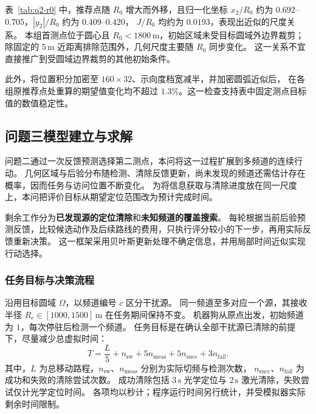 \documentclass[UTF8,a4paper,12pt]{ctexart}
\begin{document}
表~\ref{tab:q2-r0} 中，推荐点随 $R_0$ 增大而外移，且归一化坐标
$x_2/R_0$ 约为 $0.692$--$0.705$，$|y_2|/R_0$ 约为 $0.409$--$0.420$，
$J/R_0$ 均约为 $0.0193$，表现出近似的尺度关系。
本组首测点位于圆心且 $R_0<1800\,\mathrm m$，初始区域未受目标圆域外边界裁剪；
除固定的 $5\,\mathrm m$ 近距离排除范围外，几何尺度主要随 $R_0$ 同步变化。
这一关系不宜直接推广到受圆域边界裁剪的其他初始条件。

此外，将位置积分加密至 $160\times32$、示向度档宽减半，并加密圆弧近似后，
在各组原推荐点处重算的期望值变化均不超过 $1.3\%$。这一检查支持表中固定测点目标值的数值稳定性。

\subsection{问题三模型建立与求解}
\label{sec:q3}

问题二通过一次反馈预测选择第二测点，本问将这一过程扩展到多频道的连续行动。
几何区域与后验分布随检测、清除反馈更新，尚未发现的频道还需估计存在概率，因而任务与访问位置不断变化。
为将信息获取与清除进度放在同一尺度上，本问把评价目标从期望定位范围改为预计完成时间。

剩余工作分为\textbf{已发现源的定位清除}和\textbf{未知频道的覆盖搜索}。
每轮根据当前后验预测反馈，比较候选动作及后续路线的费用，只执行评分较小的下一步，再用实际反馈重新决策。
这一框架采用贝叶斯更新处理不确定信息，并用局部时间近似实现行动选择。

\subsubsection{任务目标与决策流程}

沿用目标圆域 $\Omega$，以频道编号 $c$ 区分干扰源。
同一频道至多对应一个源，其接收半径 $R_c\in[1000,1500]\,\mathrm m$ 在任务期间保持不变。
机器狗从原点出发，初始频道为 $1$，每次停驻后检测一个频道。
任务目标是在确认全部干扰源已清除的前提下，尽量减少总虚拟时间：
\begin{equation}
  T=\frac{L}{5}+n_{\mathrm{sw}}+5n_{\mathrm{meas}}
    +5n_{\mathrm{succ}}+3n_{\mathrm{fail}}.
  \label{eq:q3-time}
\end{equation}
其中，$L$ 为总移动路程，$n_{\mathrm{sw}}$、$n_{\mathrm{meas}}$ 分别为实际切频与检测次数，
$n_{\mathrm{succ}}$、$n_{\mathrm{fail}}$ 为成功和失败的清除尝试次数。
成功清除包括 $3\,\mathrm s$ 光学定位与 $2\,\mathrm s$ 激光清除，失败尝试仅计光学定位时间。
各项均以秒计；程序运行时间另行统计，并受模拟器实际剩余时间限制。
\end{document}
